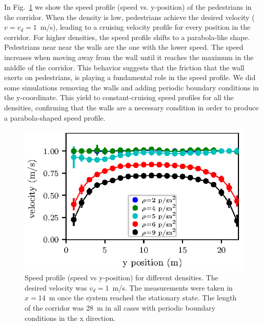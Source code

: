 In Fig.~\ref{speed-profile-w22} we show the speed profile (speed vs. y-position) of the pedestrians in the  corridor. When the density is low, pedestrians achieve the desired velocity ($v=v_d=1$~m/s), leading to a cruising velocity profile for every position in the corridor. For higher densities, the speed profile shifts to a parabola-like shape. Pedestrians near near the walls are the one with the lower speed. The speed increases when moving away from the wall until it reaches the maximum in the middle of the corridor. This behavior suggests that the friction that the wall exerts on pedestrians, is playing a fundamental role in the speed profile. We did some simulations removing the walls and adding periodic boundary conditions in the y-coordinate. This yield to constant-cruising speed profiles for all the densities, confirming that the walls are a necessary condition in order to produce a parabola-shaped speed profile.\\


\begin{figure}[htbp!]
\includegraphics[width=\columnwidth]
{plots/v(y)_width22_k24.eps}
\caption{\label{speed-profile-w22} Speed profile (speed vs y-position) for different densities. The desired velocity was $v_d = 1$~m/s. The measurements were taken in $x=14$~m once the system reached the stationary state. The length of the corridor was 28~m in all cases with periodic boundary conditions in the x direction.  }
\end{figure}





